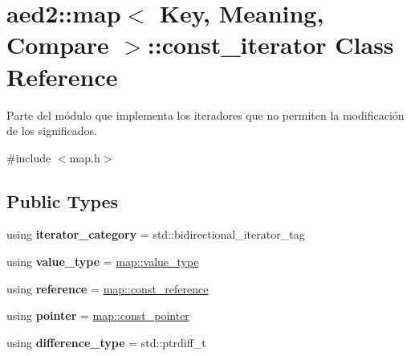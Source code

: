 \hypertarget{classaed2_1_1map_1_1const__iterator}{}\section{aed2\+:\+:map$<$ Key, Meaning, Compare $>$\+:\+:const\+\_\+iterator Class Reference}
\label{classaed2_1_1map_1_1const__iterator}


Parte del módulo que implementa los iteradores que no permiten la modificación de los significados.  




{\ttfamily \#include $<$map.\+h$>$}

\subsection*{Public Types}
\begin{DoxyCompactItemize}
\item 
\mbox{\label{classaed2_1_1map_1_1const__iterator_ae3050a75c780758e4fd845e82bf3d126}} 
using {\bfseries iterator\+\_\+category} = std\+::bidirectional\+\_\+iterator\+\_\+tag
\item 
\mbox{\label{classaed2_1_1map_1_1const__iterator_a018660e08860d835cc5a369184225777}} 
using {\bfseries value\+\_\+type} = \hyperlink{classaed2_1_1map_a719db98e0ff9a837610f76be33264680}{map\+::value\+\_\+type}
\item 
\mbox{\label{classaed2_1_1map_1_1const__iterator_a580a6321f1422fcad69b960e692e1ac0}} 
using {\bfseries reference} = \hyperlink{classaed2_1_1map_a277080d3db76f19df9319ecba16475a9}{map\+::const\+\_\+reference}
\item 
\mbox{\label{classaed2_1_1map_1_1const__iterator_aaaf13be3c4526577ac589db941fe9125}} 
using {\bfseries pointer} = \hyperlink{classaed2_1_1map_a1366fc3e227a49777cb748fc6d4e022b}{map\+::const\+\_\+pointer}
\item 
\mbox{\label{classaed2_1_1map_1_1const__iterator_aa9b9d1a209de54405f5bb385bd54ae4c}} 
using {\bfseries difference\+\_\+type} = std\+::ptrdiff\+\_\+t
\end{DoxyCompactItemize}
